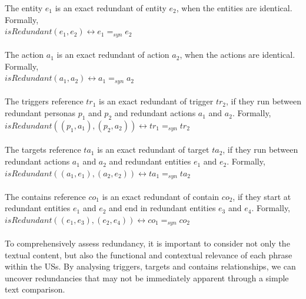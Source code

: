 \begin{definition}
	The entity $e_1$ is an exact redundant of entity $e_2$, when the entities are identical. Formally,\\
	$isRedundant(e_1,e_2) \leftrightarrow e_1 =_{syn} e_2$\\\\
	The action $a_1$ is an exact redundant of action $a_2$, when the actions are identical. Formally,\\
	$isRedundant(a_1,a_2) \leftrightarrow a_1 =_{syn} a_2$\\\\
	The triggers reference $tr_1$ is an exact redundant of trigger $tr_2$, if they run between redundant personas $p_1$ and $p_2$ and redundant actions $a_1$ and $a_2$. Formally,\\
	$isRedundant((p_1,a_1),(p_2,a_2)) \leftrightarrow tr_1 =_{syn} tr_2$\\\\
	The targets reference $ta_1$ is an exact redundant of target $ta_2$, if they run between redundant actions $a_1$ and $a_2$ and redundant entities $e_1$ and $e_2$. Formally,\\
	$isRedundant((a_1,e_1),(a_2,e_2)) \leftrightarrow ta_1 =_{syn} ta_2$\\\\
	The contains reference $co_1$ is an exact redundant of contain $co_2$, if they start at redundant entities $e_1$ and $e_2$ and end in redundant entities $e_3$ and $e_4$. Formally,\\
	$isRedundant((e_1,e_3),(e_2,e_4)) \leftrightarrow co_1 =_{syn} co_2$\\\\
	To comprehensively assess redundancy, it is important to consider not only the textual content, but also the functional and contextual relevance of each phrase within the USs. By analysing triggers, targets and contains relationships, we can uncover redundancies that may not be immediately apparent through a simple text comparison.
\end{definition}	

